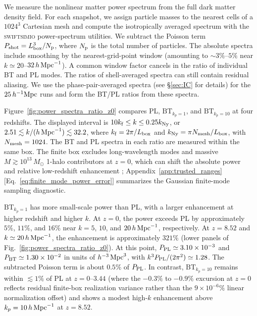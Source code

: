 \documentclass[
 reprint,
 superscriptaddress,
 nofootinbib,
 nobibnotes,
 amsmath,
 amssymb,
 aps,
 prd,
 floatfix,
 longbibliography
]{revtex4-2}
\DeclareRobustCommand{\change}[1]{#1}
\DeclareRobustCommand{\BTKPone}{\ensuremath{\mathrm{BT}_{k_p=1}}}
\DeclareRobustCommand{\BTKPten}{\ensuremath{\mathrm{BT}_{k_p=10}}}
\begin{document}
\change{We measure the nonlinear matter power spectrum from the full dark matter density field. For each snapshot, we assign particle masses to the nearest cells of a \(1024^3\) Cartesian mesh and compute the isotropically averaged spectrum with the \textsc{swiftsimio} power-spectrum utilities. We subtract the Poisson term \(P_{\rm shot}=L_{\rm box}^3/N_{\rm p}\), where \(N_{\rm p}\) is the total number of particles. The absolute spectra include smoothing by the nearest-grid-point window (amounting to \(\sim3\%\)--\(5\%\) near \(k\simeq20\)--\(32\,h\,{\rm Mpc}^{-1}\)). A common window factor cancels in the ratio of individual BT and PL modes. The ratios of shell-averaged spectra can still contain residual aliasing. We use the phase-pair-averaged spectra \citep{Pontzen2016Inverted} (see \S\ref{sec:IC} for details) for the \(25\,h^{-1}{\rm Mpc}\) runs and form the BT/PL ratios from these spectra.}

\change{Figure~\ref{fig:power_spectra_ratio_z0} compares PL, \BTKPone{}, and \BTKPten{} at four redshifts. The displayed interval is \(10k_{\rm f}\le k\le0.25k_{\rm Ny}\), or \(2.51\lesssim k/(h\,{\rm Mpc}^{-1})\lesssim32.2\), where \(k_{\rm f}=2\pi/L_{\rm box}\) and \(k_{\rm Ny}=\pi N_{\rm mesh}/L_{\rm box}\), with \(N_{\rm mesh}=1024\). The BT and PL spectra in each ratio are measured within the same box. The finite box excludes long-wavelength modes and massive \(M\gtrsim10^{13}\,M_\odot\) 1-halo contributors at \(z=0\), which can shift the absolute power and relative low-redshift enhancement \citep{Takahashi2008FiniteModes}; Appendix~\ref{app:trusted_ranges} [Eq.~\eqref{eq:finite_mode_power_error}] summarizes the Gaussian finite-mode sampling diagnostic.}

\BTKPone{} has more small-scale power than PL, with a larger enhancement at higher redshift and higher \(k\). At \(z=0\), the power exceeds PL by approximately \(5\%\), \(11\%\), and \(16\%\) near \(k=5\), \(10\), and \(20\,h\,{\rm Mpc}^{-1}\), respectively. At \(z=8.52\) and \(k\simeq20\,h\,{\rm Mpc}^{-1}\), the enhancement is approximately \(321\%\) (lower panels of Fig.~\ref{fig:power_spectra_ratio_z0}). At this point, \(P_{\rm PL}\simeq3.10\times10^{-3}\) and \(P_{\rm BT}\simeq1.30\times10^{-2}\) in units of \(h^{-3}\,{\rm Mpc}^3\), with \(k^3P_{\rm PL}/(2\pi^2)\simeq1.28\). The subtracted Poisson term is about \(0.5\%\) of \(P_{\rm PL}\). In contrast, \BTKPten{} remains within \(\lesssim1\%\) of PL at \(z=0\)--\(3.44\) (where the \(-0.3\%\) to \(-0.9\%\) excursion at \(z=0\) reflects residual finite-box realization variance rather than the \(9\times10^{-6}\%\) linear normalization offset) and shows a modest high-\(k\) enhancement above \(k_p=10\,h\,{\rm Mpc}^{-1}\) at \(z=8.52\).
\end{document}
